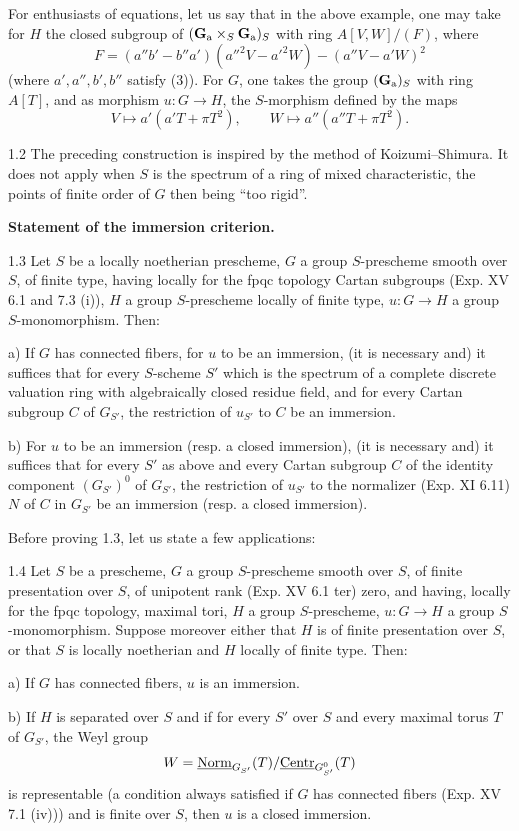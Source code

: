 For enthusiasts of equations, let us say that in the above example, one may take for $H$ the closed subgroup of $(\mathbf{G}_{\mathrm{a}}\times_S\mathbf{G}_{\mathrm{a}})_S$ with ring $A[V,W]/(F)$, where
\[
F=(a''b'-b''a')(a''^2V-a'^2W)-(a''V-a'W)^2
\]
(where $a',a'',b',b''$ satisfy (3)). For $G$, one takes the group $(\mathbf{G}_{\mathrm{a}})_S$ with ring $A[T]$, and as morphism $u:G\to H$, the $S$-morphism defined by the maps
\[
V\longmapsto a'(a'T+\pi T^2),\qquad W\longmapsto a''(a''T+\pi T^2).
\]
\begin{remark}{1.2}\label{XVI.1.2}
The preceding construction is inspired by the method of Koizumi--Shimura. It does not apply when $S$ is the spectrum of a ring of mixed characteristic, the points of finite order of $G$ then being ``too rigid''.
\end{remark}
\textbf{Statement of the immersion criterion.}
\begin{theorem}{1.3}\label{XVI.1.3}
Let $S$ be a locally noetherian prescheme, $G$ a group $S$-prescheme smooth over $S$, of finite type, having locally for the fpqc topology Cartan subgroups (Exp. XV 6.1 and 7.3 (i)), $H$ a group $S$-prescheme locally of finite type, $u:G\to H$ a group $S$-monomorphism. Then:

\noindent a) If $G$ has connected fibers, for $u$ to be an immersion, (it is necessary and) it suffices that for every $S$-scheme $S'$ which is the spectrum of a complete discrete valuation ring with algebraically closed residue field, and for every Cartan subgroup $C$ of $G_{S'}$, the restriction of $u_{S'}$ to $C$ be an immersion.

\noindent b) For $u$ to be an immersion (resp. a closed immersion), (it is necessary and) it suffices that for every $S'$ as above and every Cartan subgroup $C$ of the identity component $(G_{S'})^0$ of $G_{S'}$, the restriction of $u_{S'}$ to the normalizer (Exp. XI 6.11) $N$ of $C$ in $G_{S'}$ be an immersion (resp. a closed immersion).
\end{theorem}
Before proving 1.3, let us state a few applications:
\begin{corollary}{1.4}\label{XVI.1.4}
Let $S$ be a prescheme, $G$ a group $S$-prescheme smooth over $S$, of finite presentation over $S$, of unipotent rank (Exp. XV 6.1 ter) zero, and having, locally for the fpqc topology, maximal tori, $H$ a group $S$-prescheme, $u:G\to H$ a group $S$-monomorphism. Suppose moreover either that $H$ is of finite presentation over $S$, or that $S$ is locally noetherian and $H$ locally of finite type. Then:

\noindent a) If $G$ has connected fibers, $u$ is an immersion.

\noindent b) If $H$ is separated over $S$ and if for every $S'$ over $S$ and every maximal torus $T$ of $G_{S'}$, the Weyl group
\[
W=\underline{\mathrm{Norm}}_{G_{S'}}(T)/\underline{\mathrm{Centr}}_{G^0_{S'}}(T)
\]
is representable (a condition always satisfied if $G$ has connected fibers (Exp. XV 7.1 (iv))) and is finite over $S$, then $u$ is a closed immersion.
\end{corollary}
